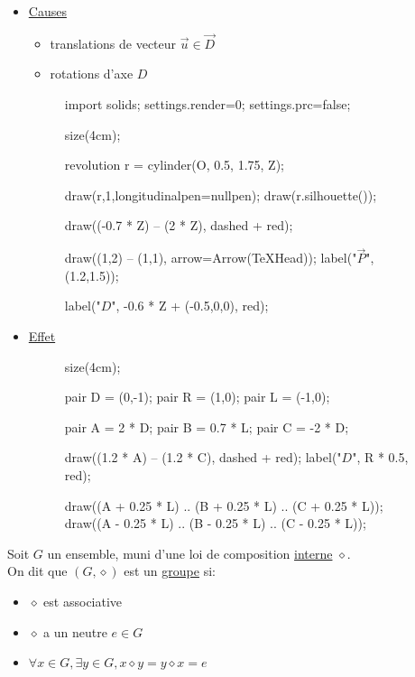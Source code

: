 \begin{itemize}
	\item \underline{Causes}
		\begin{itemize}
			\item translations de vecteur $\vec{u} \in \vec{D}$ 
			\item rotations d'axe $D$
		\end{itemize}

		\begin{figure}[H]
			\center
			\begin{asy}
				import solids;
				settings.render=0;
				settings.prc=false;

				size(4cm);

				revolution r = cylinder(O, 0.5, 1.75, Z);

				draw(r,1,longitudinalpen=nullpen);
				draw(r.silhouette());

				draw((-0.7 * Z) -- (2 * Z), dashed + red);

				draw((1,2) -- (1,1), arrow=Arrow(TeXHead));
				label("$\vec{P}$", (1.2,1.5));

				label("$D$", -0.6 * Z + (-0.5,0,0), red);

			\end{asy}
		\end{figure}

		\vspace{2mm}
	\item \underline{Effet}
		\begin{figure}[H]
			\center
			\begin{asy}
				size(4cm);

				pair D = (0,-1);
				pair R = (1,0);
				pair L = (-1,0);

				pair A = 2 * D;
				pair B = 0.7 * L;
				pair C = -2 * D;

				draw((1.2 * A) -- (1.2 * C), dashed + red);
				label("$D$", R * 0.5, red);
				

				draw((A + 0.25 * L) .. (B + 0.25 * L) .. (C + 0.25 * L));
				draw((A - 0.25 * L) .. (B - 0.25 * L) .. (C - 0.25 * L));
			\end{asy}
		\end{figure}
\end{itemize}

\begin{defn}
	Soit $G$ un ensemble, muni d'une loi de composition \underline{interne} $\diamond$.\\
	On dit que $\left( G, \diamond  \right) $ est un \underline{groupe} si:
	 \begin{itemize}
		\item $\diamond $ est associative
		\item $\diamond$ a un neutre $e \in G$ 
		\item $\forall x \in G, \exists y \in G, x\diamond y = y \diamond x = e$
	\end{itemize}
\end{defn}

